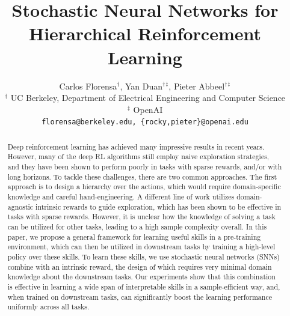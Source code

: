 \documentclass{article} %
\title{Stochastic Neural Networks for \\Hierarchical Reinforcement Learning}
\author{Carlos Florensa${^\dagger}$, Yan Duan${^\dagger}{^\ddagger}$, Pieter Abbeel${^\dagger}{^\ddagger}$ \\
$^\dagger$ UC Berkeley, Department of Electrical Engineering and Computer Science\\
$^\ddagger$ OpenAI\\
\texttt{florensa@berkeley.edu, \{rocky,pieter\}@openai.edu}
}
\begin{document}
	
	\maketitle

\begin{abstract}








Deep reinforcement learning has achieved many impressive results in recent years. However, many of the deep RL algorithms still employ naive exploration strategies, and they have been shown to perform poorly in tasks with sparse rewards, and/or with long horizons. To tackle these challenges, there are two common approaches. The first approach is to design a hierarchy over the actions, which would require domain-specific knowledge and careful hand-engineering. A different line of work utilizes domain-agnostic intrinsic rewards to guide exploration, which has been shown to be effective in tasks with sparse rewards. However, it is unclear how the knowledge of solving a task can be utilized for other tasks, leading to a high sample complexity overall. In this paper, we propose a general framework for learning useful skills in a pre-training environment, which can then be utilized in downstream tasks by training a high-level policy over these skills. To learn these skills, we use stochastic neural networks (SNNs) combine with an intrinsic reward, the design of which requires very minimal domain knowledge about the downstream tasks. Our experiments show that this combination is effective in learning a wide span of interpretable skills in a sample-efficient way, and, when trained on downstream tasks, can significantly boost the learning performance uniformly across all tasks.


\end{abstract}
\end{document}
